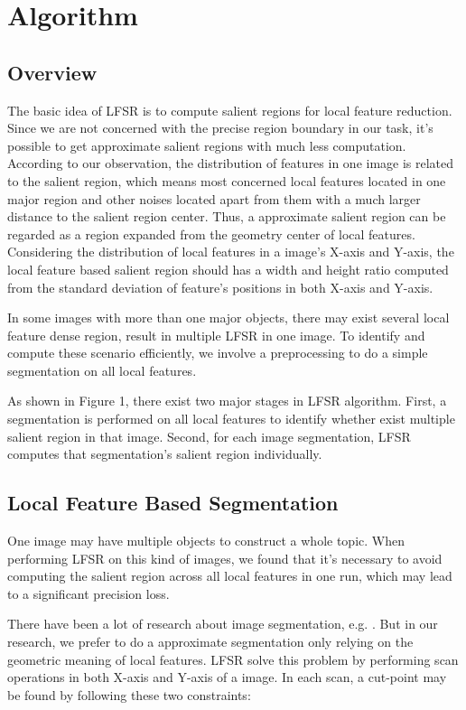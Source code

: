\section{Algorithm}

\subsection{Overview}

The basic idea of LFSR is to compute salient regions for local feature reduction. Since we are not concerned with the precise region boundary in our task, it's possible to get approximate salient regions with much less computation. According to our observation, the distribution of features in one image is related to the salient region, which means most concerned local features located in one major region and other noises located apart from them with a much larger distance to the salient region center. Thus, a approximate salient region can be regarded as a region expanded from the geometry center of local features. Considering the distribution of local features in a image's X-axis and Y-axis, the local feature based salient region should has a width and height ratio computed from the standard deviation of feature's positions in both X-axis and Y-axis.

In some images with more than one major objects, there may exist several local feature dense region, result in multiple LFSR in one image. To identify and compute these scenario efficiently, we involve a preprocessing to do a simple segmentation on all local features. 

As shown in Figure 1, there exist two major stages in LFSR algorithm. First, a segmentation is performed on all local features to identify whether exist multiple salient region in that image. Second, for each image segmentation, LFSR computes that segmentation's salient region individually.

\subsection{Local Feature Based Segmentation}

One image may have multiple objects to construct a whole topic. When performing LFSR on this kind of images, we found that it's necessary to avoid computing the salient region across all local features in one run, which may lead to a significant precision loss.

There have been a lot of research about image segmentation, e.g. . But in our research, we prefer to do a approximate segmentation only relying on the geometric meaning of local features. LFSR solve this problem by performing scan operations in both X-axis and Y-axis of a image. In each scan, a cut-point may be found by following these two constraints:

